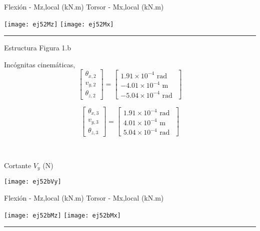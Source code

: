 Flexión - Mz,local (kN.m) \hfill  Torsor - Mx,local (kN.m)

\texttt{[image: ej52Mz]}
\texttt{[image: ej52Mx]}


\hrule 

Estructura Figura 1.b



\begin{minipage}{0.45\textwidth}
	Incógnitas cinemáticas,
	$$
	\left[
	\begin{matrix}
	\theta_{x,2} \\
	v_{y,2} \\
	\theta_{z,2}
	\end{matrix}
	\right]
	=
	\left[
	\begin{matrix}
	 1.91\times 10^{-4} \text{ rad }\\
	-4.01\times 10^{-4} \text{ m }\\
	-5.04\times 10^{-4} \text{ rad }
	\end{matrix}
	\right]
	$$
	
	$$
	\left[
	\begin{matrix}
	\theta_{x,3} \\
	v_{y,3} \\
	\theta_{z,3}
	\end{matrix}
	\right]
	=
	\left[
	\begin{matrix}
	 1.91\times 10^{-4} \text{ rad }\\
	 4.01\times 10^{-4} \text{ m }\\
	 5.04\times 10^{-4} \text{ rad }
	\end{matrix}
	\right]
	$$
\end{minipage}
~
\begin{minipage}{0.45\textwidth}
	Cortante $V_y$ (N)
	
	\texttt{[image: ej52bVy]}
\end{minipage}


Flexión - Mz,local (kN.m) \hfill Torsor - Mx,local (kN.m)

\texttt{[image: ej52bMz]}
\texttt{[image: ej52bMx]}



\hrule 

\subsection{}



